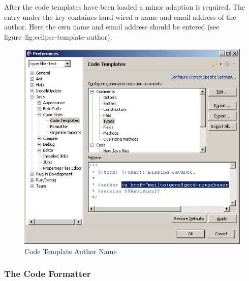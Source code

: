 After the code templates have been loaded a minor adaption is
required. The entry under the key  containes
hard-wired a name and email address of the author. Here the own name
and email address should be entered (see
figure~{fig:eclipse-template-author}).
\begin{figure}[htp]
  \centering  \includegraphics[scale=.4]{image/eclipse/template-author}
  \caption{Code Template Author Name}\label{fig:eclipse-template-author}
\end{figure}


\subsubsection{The Code Formatter}

